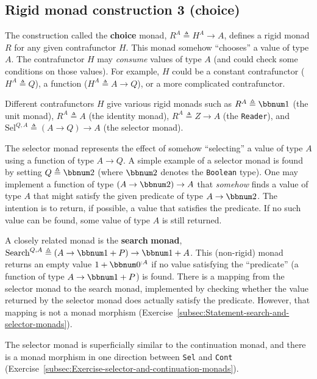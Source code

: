 \subsection{Rigid monad construction 3 (choice)\label{subsec:Rigid-monad-construction-1-choice}}

The construction called the \textbf{choice}
monad, $R^{A}\triangleq H^{A}\rightarrow A$, defines a rigid monad
$R$ for any given contrafunctor $H$. This monad somehow \textsf{``}chooses\textsf{''}
a value of type $A$. The contrafunctor $H$ may \emph{consume} values
of type $A$ (and could check some conditions on those values). For
example, $H$ could be a constant contrafunctor ($H^{A}\triangleq Q$),
a function ($H^{A}\triangleq A\rightarrow Q$), or a more complicated
contrafunctor.

Different contrafunctors $H$ give various rigid monads such as $R^{A}\triangleq\bbnum 1$
(the unit monad), $R^{A}\triangleq A$ (the identity monad), $R^{A}\triangleq Z\rightarrow A$
(the \lstinline!Reader!), and $\text{Sel}^{Q,A}\triangleq\left(A\rightarrow Q\right)\rightarrow A$
(the selector monad). 

The selector monad represents the effect of somehow \textsf{``}selecting\textsf{''}
a value of type $A$ using a function of type $A\rightarrow Q$. A
simple example of a selector monad is found by setting $Q\triangleq\bbnum 2$
(where $\bbnum 2$ denotes the \lstinline!Boolean! type). One may
implement a function of type $\left(A\rightarrow\bbnum 2\right)\rightarrow A$
that \emph{somehow} finds a value of type $A$ that might satisfy
the given predicate of type $A\rightarrow\bbnum 2$. The intention
is to return, if possible, a value that satisfies the predicate. If
no such value can be found, some value of type $A$ is still returned.

A closely related monad is the \textbf{search} \textbf{monad},
$\text{Search}^{Q,A}\triangleq\left(A\rightarrow\bbnum 1+P\right)\rightarrow\bbnum 1+A$.
This (non-rigid) monad returns an empty value $1+\bbnum 0^{:A}$ if
no value satisfying the \textsf{``}predicate\textsf{''} (a function of type $A\rightarrow\bbnum 1+P$)
is found. There is a mapping from the selector monad to the search
monad, implemented by checking whether the value returned by the selector
monad does actually satisfy the predicate. However, that mapping is
not a monad morphism (Exercise~\ref{subsec:Statement-search-and-selector-monads}).

The selector monad is superficially similar to the continuation monad,
and there is a monad morphism in one direction between \lstinline!Sel!
and \lstinline!Cont! (Exercise~\ref{subsec:Exercise-selector-and-continuation-monads}).

